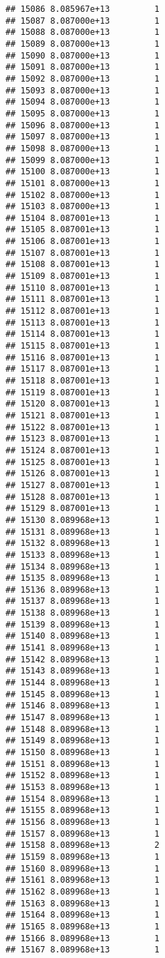\documentclass[
]{article}
\begin{document}
\begin{verbatim}
## 15086 8.085967e+13         1
## 15087 8.087000e+13         1
## 15088 8.087000e+13         1
## 15089 8.087000e+13         1
## 15090 8.087000e+13         1
## 15091 8.087000e+13         1
## 15092 8.087000e+13         1
## 15093 8.087000e+13         1
## 15094 8.087000e+13         1
## 15095 8.087000e+13         1
## 15096 8.087000e+13         1
## 15097 8.087000e+13         1
## 15098 8.087000e+13         1
## 15099 8.087000e+13         1
## 15100 8.087000e+13         1
## 15101 8.087000e+13         1
## 15102 8.087000e+13         1
## 15103 8.087000e+13         1
## 15104 8.087001e+13         1
## 15105 8.087001e+13         1
## 15106 8.087001e+13         1
## 15107 8.087001e+13         1
## 15108 8.087001e+13         1
## 15109 8.087001e+13         1
## 15110 8.087001e+13         1
## 15111 8.087001e+13         1
## 15112 8.087001e+13         1
## 15113 8.087001e+13         1
## 15114 8.087001e+13         1
## 15115 8.087001e+13         1
## 15116 8.087001e+13         1
## 15117 8.087001e+13         1
## 15118 8.087001e+13         1
## 15119 8.087001e+13         1
## 15120 8.087001e+13         1
## 15121 8.087001e+13         1
## 15122 8.087001e+13         1
## 15123 8.087001e+13         1
## 15124 8.087001e+13         1
## 15125 8.087001e+13         1
## 15126 8.087001e+13         1
## 15127 8.087001e+13         1
## 15128 8.087001e+13         1
## 15129 8.087001e+13         1
## 15130 8.089968e+13         1
## 15131 8.089968e+13         1
## 15132 8.089968e+13         1
## 15133 8.089968e+13         1
## 15134 8.089968e+13         1
## 15135 8.089968e+13         1
## 15136 8.089968e+13         1
## 15137 8.089968e+13         1
## 15138 8.089968e+13         1
## 15139 8.089968e+13         1
## 15140 8.089968e+13         1
## 15141 8.089968e+13         1
## 15142 8.089968e+13         1
## 15143 8.089968e+13         1
## 15144 8.089968e+13         1
## 15145 8.089968e+13         1
## 15146 8.089968e+13         1
## 15147 8.089968e+13         1
## 15148 8.089968e+13         1
## 15149 8.089968e+13         1
## 15150 8.089968e+13         1
## 15151 8.089968e+13         1
## 15152 8.089968e+13         1
## 15153 8.089968e+13         1
## 15154 8.089968e+13         1
## 15155 8.089968e+13         1
## 15156 8.089968e+13         1
## 15157 8.089968e+13         1
## 15158 8.089968e+13         2
## 15159 8.089968e+13         1
## 15160 8.089968e+13         1
## 15161 8.089968e+13         1
## 15162 8.089968e+13         1
## 15163 8.089968e+13         1
## 15164 8.089968e+13         1
## 15165 8.089968e+13         1
## 15166 8.089968e+13         1
## 15167 8.089968e+13         1

\end{verbatim}
\end{document}
